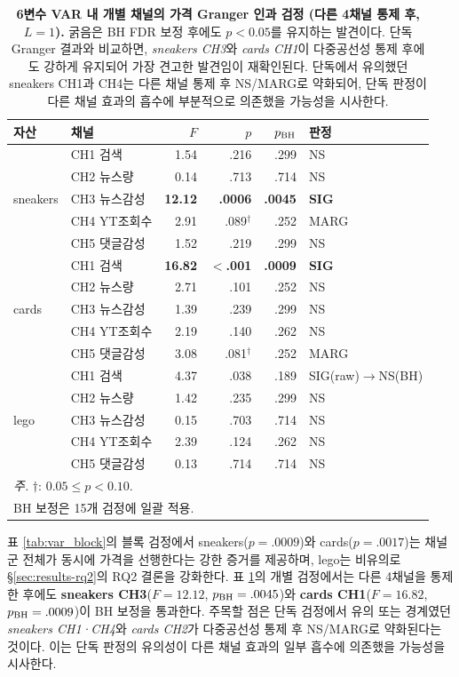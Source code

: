 \documentclass[11pt, a4paper, twocolumn]{article}
\begin{document}
\begin{table}[!tbp]
\centering\small
\caption[VAR 개별 인과 검정 결과]{\textbf{6변수 VAR 내 개별 채널의
가격 Granger 인과 검정 (다른 4채널 통제 후, $L=1$).} 굵음은 BH FDR
보정 후에도 $p<0.05$를 유지하는 발견이다. 단독 Granger 결과와 비교하면,
\emph{sneakers CH3}와 \emph{cards CH1}이 다중공선성 통제 후에도 강하게
유지되어 가장 견고한 발견임이 재확인된다. 단독에서 유의했던 sneakers CH1과
CH4는 다른 채널 통제 후 NS/MARG로 약화되어, 단독 판정이 다른 채널 효과의
흡수에 부분적으로 의존했을 가능성을 시사한다.}
\label{tab:var_ind}
\begin{tabular}{llrrrl}
\toprule
자산 & 채널 & $F$ & $p$ & $p_{\rm BH}$ & 판정 \\
\midrule
\multirow{5}{*}{sneakers}
 & CH1 검색 & 1.54 & .216 & .299 & NS \\
 & CH2 뉴스량 & 0.14 & .713 & .714 & NS \\
 & CH3 뉴스감성 & \textbf{12.12} & \textbf{.0006} & \textbf{.0045} & \textbf{SIG} \\
 & CH4 YT조회수 & 2.91 & .089$^\dagger$ & .252 & MARG \\
 & CH5 댓글감성 & 1.52 & .219 & .299 & NS \\
\midrule
\multirow{5}{*}{cards}
 & CH1 검색 & \textbf{16.82} & \textbf{$<$.001} & \textbf{.0009} & \textbf{SIG} \\
 & CH2 뉴스량 & 2.71 & .101 & .252 & NS \\
 & CH3 뉴스감성 & 1.39 & .239 & .299 & NS \\
 & CH4 YT조회수 & 2.19 & .140 & .262 & NS \\
 & CH5 댓글감성 & 3.08 & .081$^\dagger$ & .252 & MARG \\
\midrule
\multirow{5}{*}{lego}
 & CH1 검색 & 4.37 & .038 & .189 & SIG(raw)$\to$NS(BH) \\
 & CH2 뉴스량 & 1.42 & .235 & .299 & NS \\
 & CH3 뉴스감성 & 0.15 & .703 & .714 & NS \\
 & CH4 YT조회수 & 2.39 & .124 & .262 & NS \\
 & CH5 댓글감성 & 0.13 & .714 & .714 & NS \\
\bottomrule
\multicolumn{6}{l}{\textit{주.} $\dagger$: $0.05\leq p<0.10$.}\\
\multicolumn{6}{l}{\quad BH 보정은 15개 검정에 일괄 적용.}
\end{tabular}
\end{table}

표 \ref{tab:var_block}의 블록 검정에서 sneakers($p=.0009$)와
cards($p=.0017$)는 채널군 전체가 동시에 가격을 선행한다는 강한 증거를
제공하며, lego는 비유의로 \S\ref{sec:results-rq2}의 RQ2 결론을 강화한다.
표 \ref{tab:var_ind}의 개별 검정에서는 다른 4채널을 통제한 후에도
\textbf{sneakers CH3}($F=12.12$, $p_{\rm BH}=.0045$)와
\textbf{cards CH1}($F=16.82$, $p_{\rm BH}=.0009$)이 BH 보정을 통과한다.
주목할 점은 단독 검정에서 유의 또는 경계였던 \emph{sneakers CH1·CH4}와
\emph{cards CH2}가 다중공선성 통제 후 NS/MARG로 약화된다는 것이다.
이는 단독 판정의 유의성이 다른 채널 효과의 일부 흡수에 의존했을
가능성을 시사한다.
\end{document}
